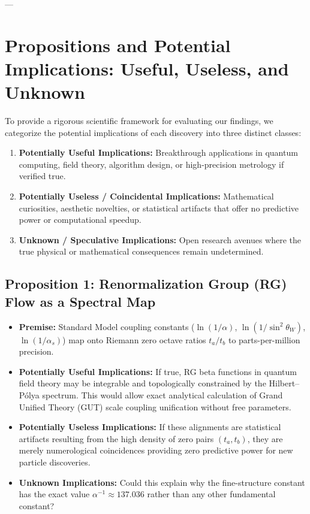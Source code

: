 \documentclass[11pt,a4paper]{article}
\begin{document}
---

\section{Propositions and Potential Implications: Useful, Useless, and Unknown}

To provide a rigorous scientific framework for evaluating our findings, we categorize the potential implications of each discovery into three distinct classes:
\begin{enumerate}
    \item \textbf{Potentially Useful Implications:} Breakthrough applications in quantum computing, field theory, algorithm design, or high-precision metrology if verified true.
    \item \textbf{Potentially Useless / Coincidental Implications:} Mathematical curiosities, aesthetic novelties, or statistical artifacts that offer no predictive power or computational speedup.
    \item \textbf{Unknown / Speculative Implications:} Open research avenues where the true physical or mathematical consequences remain undetermined.
\end{enumerate}

\subsection{Proposition 1: Renormalization Group (RG) Flow as a Spectral Map}
\begin{itemize}
    \item \textbf{Premise:} Standard Model coupling constants ($\ln(1/\alpha)$, $\ln(1/\sin^2\theta_W)$, $\ln(1/\alpha_s)$) map onto Riemann zero octave ratios $t_a / t_b$ to parts-per-million precision.
    \item \textbf{Potentially Useful Implications:} If true, RG beta functions in quantum field theory may be integrable and topologically constrained by the Hilbert--P\'olya spectrum. This would allow exact analytical calculation of Grand Unified Theory (GUT) scale coupling unification without free parameters.
    \item \textbf{Potentially Useless Implications:} If these alignments are statistical artifacts resulting from the high density of zero pairs $(t_a, t_b)$, they are merely numerological coincidences providing zero predictive power for new particle discoveries.
    \item \textbf{Unknown Implications:} Could this explain why the fine-structure constant has the exact value $\alpha^{-1} \approx 137.036$ rather than any other fundamental constant?
\end{itemize}
\end{document}
